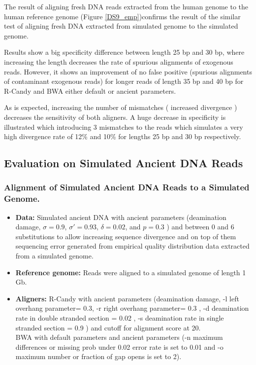 \documentclass[11pt,a4paper]{report}
\begin{document}
The result of aligning fresh DNA reads extracted from the human genome
to the human reference genome (Figure \ref{DS9_emp})confirms the result 
of the similar test of aligning fresh DNA extracted from simulated genome 
to the simulated genome.  

 
Results show a big specificity difference between length 25 bp and 30 bp, 
where increasing the length decreases the rate of spurious alignments of
exogenous reads. However, it shows an improvement of no false positive (spurious
alignments of contaminant exogenous reads) for longer reads of length 35 bp and 
40 bp for R-Candy and BWA either default or ancient parameters. 

As is expected, increasing the number of mismatches ( increased divergence ) 
decreases the sensitivity of both aligners. A huge decrease in specificity is
illustrated which introducing 3 mismatches to the reads which simulates a very
high divergence rate of 12\% and 10\% for lengths 25 bp and 30 bp respectively.




\subsection{Evaluation on Simulated Ancient DNA Reads}

\subsubsection{Alignment of Simulated Ancient DNA Reads to a Simulated Genome.}
\label{ Alignment of Simulated Ancient DNA Reads to a Simulated Genome.}

\begin{itemize}
 
   
    \item \textbf{Data:} Simulated ancient DNA 
     with ancient parameters (deamination damage, $ \sigma = 0.9$, 
    $ \sigma' = 0.93 $, $\delta = 0.02 $,  and $p = 0.3 $ \cite{mapdamage2})
    and between 0 and 6 substitutions to allow increasing sequence divergence
    and on top of them sequencing error generated from empirical quality 
    distribution data extracted from a simulated genome.
  
 
   \item \textbf{Reference genome:}  Reads were aligned to a simulated genome of 
   length 1 Gb.


  \item \textbf{Aligners:} R-Candy with ancient parameters 
  (deamination damage, -l left overhang parameter= 0.3,
   -r right overhang parameter= 0.3 , 
   -d deamination rate in double stranded section = 0.02 , 
   -s deamination rate in single stranded section = 0.9 )
   and cutoff for alignment score at 20. \\
   BWA with default parameters and ancient parameters
   (-n maximum differences or missing prob under 0.02 error rate is set to 0.01 
   and -o maximum number or fraction of gap opens is set to 2)\cite{green2010draft}.

  \end{itemize}
\end{document}
